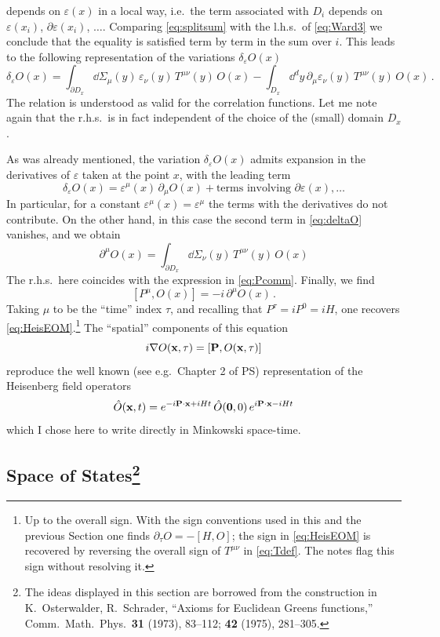 depends on $\varepsilon(x)$ in a local way, i.e.\ the term associated with $D_i$
depends on $\varepsilon(x_i)$, $\partial\varepsilon(x_i)$, $\dots$. Comparing
\eqref{eq:splitsum} with the l.h.s.\ of \eqref{eq:Ward3} we conclude that the
equality is satisfied term by term in the sum over $i$. This leads to the following
representation of the variations $\delta_\varepsilon O(x)$
\begin{equation}\label{eq:deltaO}
\delta_\varepsilon O(x)=\int_{\partial D_x}\dd\Sigma_\mu(y)\,\varepsilon_\nu(y)\,T^{\mu\nu}(y)\,O(x)-\int_{D_x}\dd^dy\,\partial_\mu\varepsilon_\nu(y)\,T^{\mu\nu}(y)\,O(x)\,.
\end{equation}
The relation is understood as valid for the correlation functions. Let me note again
that the r.h.s.\ is in fact independent of the choice of the (small) domain $D_x$.

As was already mentioned, the variation $\delta_\varepsilon O(x)$ admits expansion in
the derivatives of $\varepsilon$ taken at the point $x$, with the leading term
\[
\delta_\varepsilon O(x)=\varepsilon^\mu(x)\,\partial_\mu O(x)+\text{terms involving }\partial\varepsilon(x),\dots
\]
In particular, for a constant $\varepsilon^\mu(x)=\varepsilon^\mu$ the terms with
the derivatives do not contribute. On the other hand, in this case the second term
in \eqref{eq:deltaO} vanishes, and we obtain
\[
\partial^\mu O(x)=\int_{\partial D_x}\dd\Sigma_\nu(y)\,T^{\mu\nu}(y)\,O(x)
\]
The r.h.s.\ here coincides with the expression in \eqref{eq:Pcomm}. Finally, we
find
\[
[P^\mu,O(x)]=-i\,\partial^\mu O(x)\,.
\]
Taking $\mu$ to be the ``time'' index $\tau$, and recalling that $P^\tau=iP^0=iH$,
one recovers \eqref{eq:HeisEOM}.\footnote{Up to the overall sign. With the sign
conventions used in this and the previous Section one finds
$\partial_\tau O=-[H,O]$; the sign in \eqref{eq:HeisEOM} is recovered by reversing
the overall sign of $T^{\mu\nu}$ in \eqref{eq:Tdef}. The notes flag this sign
without resolving it.} The ``spatial'' components of this equation
\[
i\nabla O(\mathbf{x},\tau)=[\mathbf{P},O(\mathbf{x},\tau)]
\]
reproduce the well known (see e.g.\ Chapter 2 of PS) representation of the
Heisenberg field operators
\[
\hat O(\mathbf{x},t)=e^{-i\mathbf{P}\cdot\mathbf{x}+iHt}\,\hat O(\mathbf0,0)\,e^{i\mathbf{P}\cdot\mathbf{x}-iHt}
\]
which I chose here to write directly in Minkowski space-time.

\subsection*{Space of States\protect\footnote{The ideas displayed in this section
are borrowed from the construction in K.~Osterwalder, R.~Schrader, ``Axioms for
Euclidean Greens functions,'' Comm.\ Math.\ Phys.\ \textbf{31} (1973), 83--112;
\textbf{42} (1975), 281--305.}}

